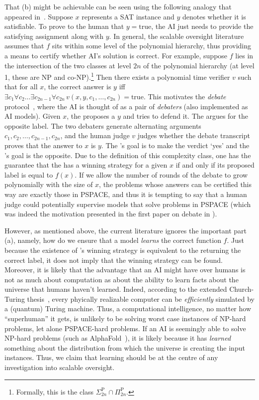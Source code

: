 That (b) might be achievable can be seen using the following analogy that appeared in~\cite{irving2018debate}. Suppose $x$ represents a SAT instance and $y$ denotes whether it is satisfiable. To prove to the human that $y=\mathrm{true}$, the AI just needs to provide the satisfying assignment along with $y$. In general, the scalable oversight literature assumes that $f$ sits within some level of the polynomial hierarchy, thus providing a means to certify whether AI's solution is correct. For example, suppose $f$ lies in the intersection of the two classes at level $2n$ of the polynomial hierarchy (at level 1, these are NP and co-NP).\footnote{Formally, this is the class $\Sigma_{2n}^{\mathrm{P}} \cap \Pi_{2n}^{\mathrm{P}}$.} Then there exists a polynomial time verifier $v$ such that for all $x$, the correct answer is $y$ iff $\exists c_1 \forall c_2 \ldots \exists c_{2n-1} \forall c_{2n}\, v(x,y,c_1,\ldots ,c_{2n}) = \mathrm{true}$. This motivates the \emph{debate} protocol~\citep{irving2018debate,browncohen2024debate}, where the AI is thought of as a pair of \emph{debaters} (also implemented as AI models). Given $x$, the \dt proposes a $y$ and tries to defend it. The \df argues for the opposite label. The two debaters  generate alternating arguments $c_1,c_2,\ldots , c_{2n-1},c_{2n}$, and the human judge $v$ judges whether the debate transcript proves that the answer to $x$ is $y$. The \dt's goal is to make the verdict `yes' and the \df's goal is the opposite. Due to the definition of this complexity class, one has the guarantee that the \dt has a winning strategy for a given $x$ if and only if its proposed label is equal to $f(x)$. If we allow the number of rounds of the debate to grow polynomially with the size of $x$, the problems whose answers can be certified this way are exactly those in PSPACE, and thus it is tempting to say that a human judge could potentially supervise models that solve problems in PSPACE (which was indeed the motivation presented in the first paper on debate in \citealp{irving2018debate}).


However, as mentioned above, the current literature ignores the important part (a), namely, how do we ensure that a model \emph{learns} the correct function $f$. Just because the existence of \dt's winning strategy is equivalent to the \dt returning the correct label, it does not imply that the winning strategy can be found. Moreover, it is likely that the advantage that an AI might have over humans is not as much about computation as about the ability to learn facts about the universe that humans haven't learned. Indeed, according to the extended Church-Turing thesis~\citep{vergis1986complexity, aaronson2005physical}, every phyically realizable computer can be \emph{efficiently} simulated by a (quantum) Turing machine. Thus, a computational intelligence, no matter how ``superhuman'' it gets, is unlikely to be solving worst case instances of NP-hard problems, let alone PSPACE-hard problems. If an AI is seemingly able to solve NP-hard problems (such as AlphaFold~\citep{jumper2021alphafold}), it is likely because it has \emph{learned} something about the distribution from which the universe is creating the input instances. Thus, we claim that learning should be at the centre of any investigation into scalable oversight. 


